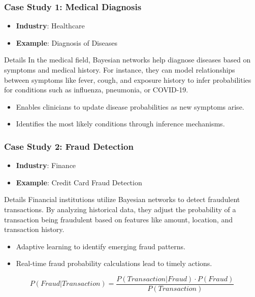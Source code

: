 \documentclass[aspectratio=169]{beamer}
\begin{document}
\begin{frame}[fragile]
    \frametitle{Case Study 1: Medical Diagnosis}
    \begin{itemize}
        \item \textbf{Industry}: Healthcare
        \item \textbf{Example}: Diagnosis of Diseases
    \end{itemize}
    \begin{block}{Details}
        In the medical field, Bayesian networks help diagnose diseases based on symptoms and medical history. For instance, they can model relationships between symptoms like fever, cough, and exposure history to infer probabilities for conditions such as influenza, pneumonia, or COVID-19.
    \end{block}
    \begin{itemize}
        \item Enables clinicians to update disease probabilities as new symptoms arise.
        \item Identifies the most likely conditions through inference mechanisms.
    \end{itemize}
\end{frame}

\begin{frame}[fragile]
    \frametitle{Case Study 2: Fraud Detection}
    \begin{itemize}
        \item \textbf{Industry}: Finance
        \item \textbf{Example}: Credit Card Fraud Detection
    \end{itemize}
    \begin{block}{Details}
        Financial institutions utilize Bayesian networks to detect fraudulent transactions. By analyzing historical data, they adjust the probability of a transaction being fraudulent based on features like amount, location, and transaction history.
    \end{block}
    \begin{itemize}
        \item Adaptive learning to identify emerging fraud patterns.
        \item Real-time fraud probability calculations lead to timely actions.
    \end{itemize}
    \begin{equation}
        P(Fraud | Transaction) = \frac{P(Transaction | Fraud) \cdot P(Fraud)}{P(Transaction)}
    \end{equation}
\end{frame}
\end{document}
